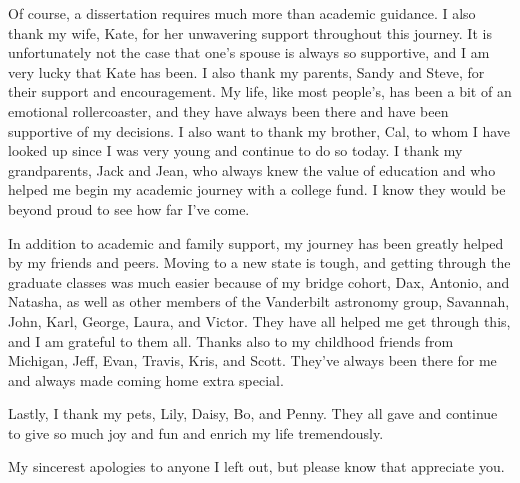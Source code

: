 \begin{doublespace}
Of course, a dissertation requires much more than academic guidance.
I also thank my wife, Kate, for her unwavering support throughout this journey.
It is unfortunately not the case that one's spouse is always so
supportive, and I am very lucky that Kate has been.
I also thank my parents, Sandy and Steve, for their support and encouragement.
My life, like most people's, has been a bit of an emotional rollercoaster,
and they have always been there and have been supportive of my decisions.
I also want to thank my brother, Cal, to whom I have looked up since I was
very young and continue to do so today.
I thank my grandparents, Jack and Jean, who always knew the value
of education and who helped me begin my academic journey with a college fund.
I know they would be beyond proud to see how far I've come.

In addition to academic and family support, my journey has been greatly
helped by my friends and peers.
Moving to a new state is tough, and
getting through the graduate classes was much easier because of my
bridge cohort, Dax, Antonio, and Natasha, as well as other members of the
Vanderbilt astronomy group, Savannah, John, Karl, George, Laura, and Victor.
They have all helped me get through this, and I am grateful to them all.
Thanks also to my childhood friends from Michigan,
Jeff, Evan, Travis, Kris, and Scott.
They've always been there for me and always made coming home extra special.

Lastly, I thank my pets, Lily, Daisy, Bo, and Penny.
They all gave and continue to give so much joy and fun and enrich
my life tremendously.

My sincerest apologies to anyone I left out, but please know that appreciate
you.

\end{doublespace}
